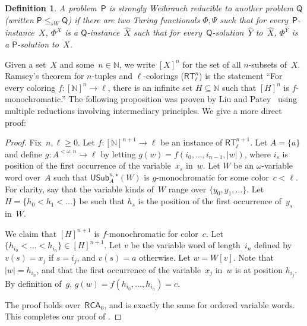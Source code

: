 \documentclass{article}
\numberwithin{theorem}{section}
\newtheorem{proposition}[theorem]{Proposition}
\newtheorem{definition}[theorem]{Definition}
\newcommand{\RCA}{\mathsf{RCA}}
\newcommand{\OVW}{\mathsf{OVW}}
\newcommand{\CSL}{\mathsf{CSL}}
\newcommand{\RT}{\mathsf{RT}}
\newcommand{\Psf}{\mathsf{P}}
\newcommand{\Qsf}{\mathsf{Q}}
\newcommand{\NN}{\mathbb{N}}
\newcommand{\USub}{\mathsf{USub}}
\def\qt#1{``#1''}%
\begin{document}
\begin{definition}
A problem~$\Psf$ is \emph{strongly Weihrauch reducible} to another problem $\Qsf$ (written $\Psf \leq_{sW} \Qsf$) if there are two Turing functionals $\Phi, \Psi$ such that for every~$\Psf$-instance~$X$, $\Phi^X$ is a $\Qsf$-instance~$\hat X$ such that for every~$\Qsf$-solution~$\hat Y$ to~$\hat X$, $\Phi^{\hat Y}$ is a $\Psf$-solution to~$X$.
\end{definition}

Given a set~$X$ and some~$n \in \NN$, we write $[X]^n$ for the set of all $n$-subsets of~$X$.
Ramsey's theorem for $n$-tuples and $\ell$-colorings ($\RT^n_\ell$) is the statement \qt{For every coloring $f : [\NN]^n \to \ell$, there is an infinite set $H \subseteq \NN$ such that $[H]^n$ is $f$-monochromatic.}
The following proposition was proven by Liu and Patey~\cite[Lemma 8.5]{liu2026reverse} using multiple reductions involving intermediary principles. We give a more direct proof:

\begin{proof}
Fix~$n, \ell \geq 0$.
Let $f : [\NN]^{n+1} \to \ell$ be an instance of $\RT^{n+1}_\ell$. Let $A = \{a\}$ and define $g : A^{<\omega, n} \to \ell$ by letting $g(w) = f(i_0, \dots, i_{n-1}, |w|)$, 
where $i_s$ is position of the first occurrence of the variable~$x_s$ in~$w$. Let $W$ be an $\omega$-variable word over~$A$ such that $\USub^{n,\star}_A(W)$ is $g$-monochromatic for some color~$c < \ell$. For clarity, say that the variable kinds of~$W$ range over $\{y_0, y_1, \dots \}$. Let $H = \{h_0 < h_1 < \dots \}$ be such that $h_s$ is the position of  the first occurrence of~$y_s$ in~$W$. 

We claim that $[H]^{n+1}$ is $f$-monochromatic for color~$c$.
Let $\{h_{i_0} < \dots < h_{i_n} \} \in [H]^{n+1}$. Let $v$ be the variable word of length~$i_n$ defined by $v(s) = x_j$ if $s = i_j$, and $v(s) = a$ otherwise. Let $w = W[v]$. Note that $|w| = h_{i_n}$, and that the first occurrence of the variable~$x_j$ in~$w$ is at position $h_{i_j}$. By definition of~$g$, $g(w) = f(h_{i_0}, \dots, h_{i_n}) = c$.

The proof holds over~$\RCA_0$, and is exactly the same for ordered variable words. This completes our proof of .
\end{proof}
\end{document}

